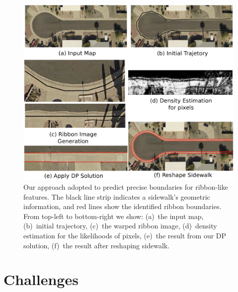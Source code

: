 \begin{figure}[H] 
\centering 
\includegraphics[width=\textwidth]{Figures/diagram.png} 
\caption[Framework Demonstration]{
Our approach adopted to predict precise boundaries for ribbon-like features. 
The black line strip indicates a sidewalk's geometric information, 
and red lines show the identified ribbon boundaries. 
From top-left to bottom-right we show:
(a)~the input map, 
(b)~initial trajectory, 
(c)~the warped ribbon image, 
(d)~density estimation for the likelihoods of pixels, 
(e)~the result from our \ac{DP} solution, 
(f)~the result after reshaping sidewalk.} 
\label{fig:fw_ov} 
\end{figure}

\section{Challenges}\label{sec:challenges}


